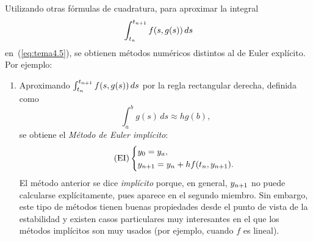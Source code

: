 Utilizando otras fórmulas de cuadratura, para aproximar la integral
$$\int_{t_n}^{t_{n+1}} f(s,g(s))\, ds$$ en~(\ref{eq:tema4.5}),
se obtienen métodos numéricos
distintos al de Euler explícito. Por ejemplo:
\begin{enumerate}
\item Aproximando $\int_{t_n}^{t_{n+1}} f(s,g(s))\, ds$ por la regla
  rectangular derecha, definida como
  \begin{equation*}
    \int_a^b g(s)\,ds \approx hg(b),
  \end{equation*}
  se obtiene el \textit{Método de Euler implícito}:
  \begin{equation}
    \label{eq:euler-implicito}
    \tag{EI}
    \left\{
      \begin{aligned}
        &y_0={y_a},\\ &{y_{n+1}} = {y_n} + h f({t_n},{y_{n+1}}).
      \end{aligned}
    \right.
  \end{equation}
  El método anterior se dice \textit{implícito} porque, en general,
  ${y_{n+1}}$ no puede calcularse explícitamente, pues aparece en el
  segundo miembro. Sin embargo, este tipo de métodos tienen buenas
  propiedades desde el punto de vista de la estabilidad y existen
  casos particulares muy interesantes en el que los métodos implícitos
  son muy usados (por ejemplo, cuando $f$ es lineal).


\end{enumerate}
